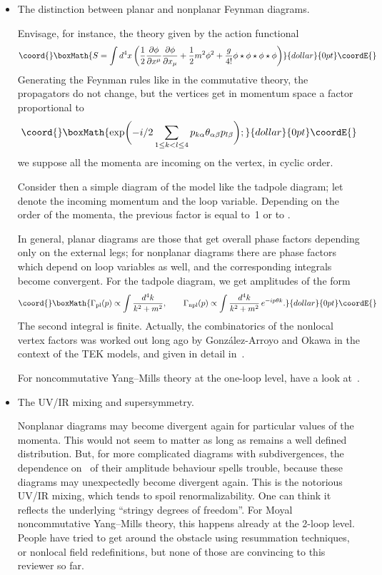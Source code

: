 \documentclass[a4paper,12pt]{article}
\renewcommand{\a}{\alpha}           %
\renewcommand{\b}{\beta}            %
\providecommand{\Ga}{\Gamma}            %
\providecommand{\pd}[2]{\frac{\partial#1}{\partial#2}} %
\providecommand{\1}{\mathbf{1}}         %
\providecommand{\7}{\dagger}            %
\providecommand{\8}{\bullet}            %
\renewcommand{\.}{\cdot}            %
\renewcommand{\:}{\colon}           %
\begin{document}
\begin{itemize}

\item  The distinction between planar and nonplanar Feynman diagrams.

Envisage, for instance, the theory given by the action functional
$$\coord{}\boxMath{
S = \int d^4x\, \biggl(\frac{1}{2} \pd{\phi}{x^\mu} \pd{\phi}{x_\mu} 
+ \frac{1}{2} m^2\phi^2 + \frac{g}{4!} \phi\star\phi\star\phi\star\phi 
\biggr)
}{dollar}{0pt}\coordE{}$$
Generating the Feynman rules like in the commutative theory, the
propagators do not change, but the vertices get in momentum space a
factor proportional to
$$\coord{}\boxMath{
\exp\biggl(-i/2\sum_{1\leq k<l\leq 4}p_{k\a}\theta_{\a\b}p_{l\b}\biggr);
}{dollar}{0pt}\coordE{}$$
we suppose all the momenta are incoming on the vertex, in cyclic order.

Consider then a simple diagram of the model like the tadpole diagram;
let \coordHE{} denote the incoming momentum and \coordHE{} the loop variable.
Depending on the order of the momenta, the previous factor is equal
to~1 or to \myHighlight{$e^{-ip_\a\theta_{\a\b}k_\b}$}\coordHE{}.

In general, planar diagrams are those that get overall phase factors
depending only on the external legs; for nonplanar diagrams there are
phase factors which depend on loop variables as well, and the
corresponding integrals become convergent. For the tadpole diagram, we
get amplitudes of the form
$$\coord{}\boxMath{
\Ga_{\rm pl}(p)\propto \int \frac{d^4k}{k^2 + m^2},  \qquad
\Ga_{\rm npl}(p)\propto \int \frac{d^4k}{k^2 + m^2}\, e^{-ip\theta k}.
}{dollar}{0pt}\coordE{}$$
The second integral is finite. Actually, the combinatorics of the
nonlocal vertex factors was worked out long ago by Gonz\'alez-Arroyo
and Okawa in the context of the TEK models, and given in detail
in~\cite{KorthalsAltes}.

For noncommutative Yang--Mills theory at the one-loop level, have a
look at~\cite{MartinSRtwo}.

\item  The UV/IR mixing and supersymmetry.

Nonplanar diagrams may become divergent again for particular values of
the momenta. This would not seem to matter as long as
\myHighlight{$\Ga_{\rm npl}(p)$}\coordHE{} remains a well defined distribution. But, for more
complicated diagrams with subdivergences, the dependence on~\coordHE{} of
their amplitude behaviour spells trouble, because these diagrams may
unexpectedly become divergent again. This is the notorious UV/IR
mixing, which tends to spoil renormalizability. One can think it
reflects the underlying ``stringy degrees of freedom''. For Moyal
noncommutative Yang--Mills theory, this happens already at the 2-loop
level. People have tried to get around the obstacle using resummation
techniques, or nonlocal field redefinitions, but none of those are
convincing to this reviewer so far.


\end{itemize}
\end{document}
